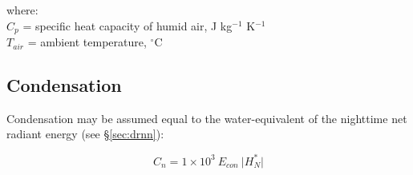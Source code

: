 \noindent where: \\ 
\indent $C_p$ = specific heat capacity of humid air, J kg$^{-1}$ K$^{-1}$\\
\indent $T_{air}$ = ambient temperature, $^{\circ}$C\\

\subsection{Condensation}
\label{sec:cond}
Condensation may be assumed equal to the water-equivalent of the nighttime net radiant energy (see \S \ref{sec:drnn}):

\begin{equation}
\label{eq:cond}
	C_n = 1\times 10^3\: E_{con}\: \lvert H_N^{\ast} \rvert
\end{equation}


